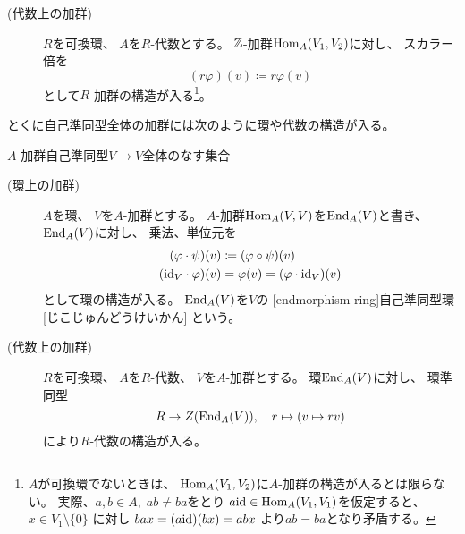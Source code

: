 \documentclass[report]{jlreq}
\begin{document}
\begin{definition}[加群準同型全体の集合]
\begin{description}
        \item[(代数上の加群)]
            $R$を可換環、
            $A$を$R$-代数とする。
            $\mathbb{Z}$-加群$\operatorname{Hom}_A(V_1, V_2)$に対し、
            スカラー倍を
            \begin{equation}
                (r \varphi)(v) \coloneqq r \varphi(v)
            \end{equation}
            として$R$-加群の構造が入る\footnote{
                $A$が可換環でないときは、
                $\operatorname{Hom}_A(V_1, V_2)$に$A$-加群の構造が入るとは限らない。
                実際、$a, b \in A, \; ab \neq ba$をとり
                $a\mathrm{id} \in \operatorname{Hom}_A(V_1, V_1)$を仮定すると、
                $x \in V_1 \setminus \{ 0 \}$
                に対し
                $bax = (a\mathrm{id})(bx) = abx$
                より$ab = ba$となり矛盾する。
            }。
    \end{description}
\end{definition}

とくに自己準同型全体の加群には次のように環や代数の構造が入る。

\begin{definition}[自己準同型環]
        {$A$-加群自己準同型$V \to V$全体のなす集合}
    \begin{description}
        \item[(環上の加群)]
            $A$を環、
            $V$を$A$-加群とする。
            $A$-加群$\operatorname{Hom}_A(V, V)$を$\operatorname{End}_A(V)$と書き、
            $\operatorname{End}_A(V)$に対し、
            乗法、単位元を
            \begin{alignat}{1}
                (\varphi \cdot \psi)(v)
                    &\coloneqq (\varphi \circ \psi)(v) \\
                (\mathrm{id}_V \cdot \varphi)(v)
                    &= \varphi(v)
                    = (\varphi \cdot \mathrm{id}_V)(v)
            \end{alignat}
            として環の構造が入る。
            $\operatorname{End}_A(V)$を$V$の
            [endmorphism ring]{自己準同型環}[じこじゅんどうけいかん]
            という。
        \item[(代数上の加群)]
            $R$を可換環、
            $A$を$R$-代数、
            $V$を$A$-加群とする。
            環$\operatorname{End}_A(V)$に対し、
            環準同型
            \begin{equation}
                R \to Z(\operatorname{End}_A(V)),
                \quad
                r \mapsto (v \mapsto rv)
            \end{equation}
            により$R$-代数の構造が入る。
    \end{description}
\end{definition}
\end{document}
